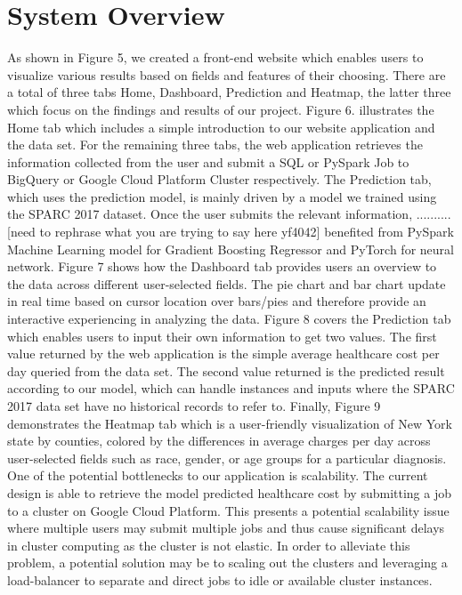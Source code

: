 \documentclass[10pt,twocolumn,letterpaper]{article}
\begin{document}

\section{System Overview}
As shown in Figure 5, we created a front-end website which enables users to visualize various results based on fields and features of their choosing. There are a total of three tabs Home, Dashboard, Prediction and Heatmap, the latter three which focus on the findings and results of our project. Figure 6. illustrates the Home tab which includes a simple introduction to our website application and the data set. For the remaining three tabs, the web application retrieves the information collected from the user and submit a SQL or PySpark Job to BigQuery or Google Cloud Platform Cluster respectively. The Prediction tab, which uses the prediction model, is mainly driven by a model we trained using the SPARC 2017 dataset. Once the user submits the relevant information, .......... [need to rephrase what you are trying to say here yf4042] benefited from PySpark Machine Learning model for Gradient Boosting Regressor and PyTorch for neural network. Figure 7 shows how the Dashboard tab provides users an overview to the data across different user-selected fields. The pie chart and bar chart update in real time based on cursor location over bars/pies and therefore provide an interactive experiencing in analyzing the data. Figure 8 covers the Prediction tab which enables users to input their own information to get two values. The first value returned by the web application is the simple average healthcare cost per day queried from the data set. The second value returned is the predicted result according to our model, which can handle instances and inputs where the SPARC 2017 data set have no historical records to refer to. Finally, Figure 9 demonstrates the Heatmap tab which is a user-friendly visualization of New York state by counties, colored by the differences in average charges per day across user-selected fields such as race, gender, or age groups for a particular diagnosis.
One of the potential bottlenecks to our application is scalability. The current design is able to retrieve the model predicted healthcare cost by submitting a job to a cluster on Google Cloud Platform. This presents a potential scalability issue where multiple users may submit multiple jobs and thus cause significant delays in cluster computing as the cluster is not elastic. In order to alleviate this problem, a potential solution may be to scaling out the clusters and leveraging a load-balancer to separate and direct jobs to idle or available cluster instances.
\end{document}

